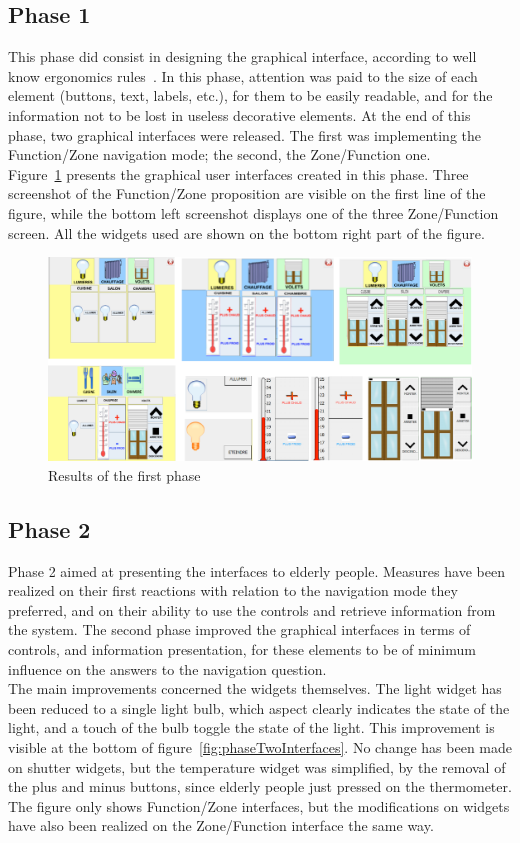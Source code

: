 \subsection{Phase 1}
This phase did consist in designing the graphical interface, according to well know ergonomics rules~\cite{Bastien:1993}. In this phase, attention was paid to the size of each element (buttons, text, labels, etc.), for them to be easily readable, and for the information not to be lost in useless decorative elements. At the end of this phase, two graphical interfaces were released. The first was implementing the Function/Zone navigation mode; the second, the Zone/Function one.\\
Figure~\ref{fig:phaseOneInterfaces} presents the graphical user interfaces created in this phase. Three screenshot of the Function/Zone proposition are visible on the first line of the figure, while the bottom left screenshot displays one of the three Zone/Function screen. All the widgets used are shown on the bottom right part of the figure.

\begin{figure}[h!]
\includegraphics[width=\textwidth]{part4/pics/PhaseOneInterfaces}
\caption{Results of the first phase}
\label{fig:phaseOneInterfaces}
\end{figure}


\subsection{Phase 2}
Phase 2 aimed at presenting the interfaces to elderly people. Measures have been realized on their first reactions with relation to the navigation mode they preferred, and on their ability to use the controls and retrieve information from the system. The second phase improved the graphical interfaces in terms of controls, and information presentation, for these elements to be of minimum influence on the answers to the navigation question.\\
The main improvements concerned the widgets themselves. The light widget has been reduced to a single light bulb, which aspect clearly indicates the state of the light, and a touch of the bulb toggle the state of the light. This improvement is visible at the bottom of figure~\ref{fig:phaseTwoInterfaces}. No change has been made on shutter widgets, but the temperature widget was simplified, by the removal of the plus and minus buttons, since elderly people just pressed on the thermometer.\\
The figure only shows Function/Zone interfaces, but the modifications on widgets have also been realized on the Zone/Function interface the same way.

